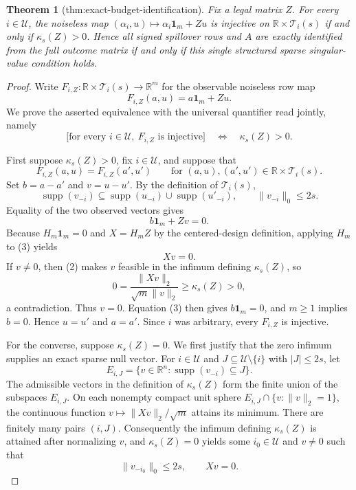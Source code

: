\documentclass{article}
\newtheorem{theorem}{Theorem}
\begin{document}
\begin{theorem}[thm:exact-budget-identification]\label{thm:exact-budget-identification}
Fix a legal matrix \(Z\). For every \(i\in\mathcal U\), the noiseless map \((\alpha_i,u)\mapsto\alpha_i\mathbf 1_m+Zu\) is injective on \(\mathbb R\times\mathcal T_i(s)\) if and only if \(\kappa_s(Z)>0\). Hence all signed spillover rows and \(A\) are exactly identified from the full outcome matrix if and only if this single structured sparse singular-value condition holds.
\end{theorem}
\begin{proof}
Write \(F_{i,Z}:\mathbb R\times\mathcal T_i(s)\to\mathbb R^m\) for the observable noiseless row map
\[
F_{i,Z}(a,u)=a\mathbf 1_m+Zu.
\]
We prove the asserted equivalence with the universal quantifier read jointly, namely
\[
\bigl[\text{for every }i\in\mathcal U,\ F_{i,Z}\text{ is injective}\bigr]
\quad\Longleftrightarrow\quad \kappa_s(Z)>0. \tag{1}
\]

First suppose \(\kappa_s(Z)>0\), fix \(i\in\mathcal U\), and suppose that
\[
F_{i,Z}(a,u)=F_{i,Z}(a',u')
\qquad
\text{for }(a,u),(a',u')\in\mathbb R\times\mathcal T_i(s).
\]
Set \(b=a-a'\) and \(v=u-u'\).  By the definition of \(\mathcal T_i(s)\),
\[
\operatorname{supp}(v_{-i})
 \subseteq \operatorname{supp}(u_{-i})\cup\operatorname{supp}(u'_{-i}),
\qquad
\lVert v_{-i}\rVert_0\le 2s. \tag{2}
\]
Equality of the two observed vectors gives
\[
b\mathbf 1_m+Zv=0. \tag{3}
\]
Because \(H_m\mathbf 1_m=0\) and \(X=H_mZ\) by the centered-design definition, applying \(H_m\) to (3) yields
\[
Xv=0. \tag{4}
\]
If \(v\ne0\), then (2) makes \(v\) feasible in the infimum defining \(\kappa_s(Z)\), so
\[
0=\frac{\lVert Xv\rVert_2}{\sqrt m\lVert v\rVert_2}
 \ge \kappa_s(Z)>0,
\]
a contradiction.  Thus \(v=0\).  Equation (3) then gives \(b\mathbf 1_m=0\), and \(m\ge1\) implies \(b=0\).  Hence \(u=u'\) and \(a=a'\).  Since \(i\) was arbitrary, every \(F_{i,Z}\) is injective.

For the converse, suppose \(\kappa_s(Z)=0\).  We first justify that the zero infimum supplies an exact sparse null vector.  For \(i\in\mathcal U\) and \(J\subseteq\mathcal U\setminus\{i\}\) with \(\lvert J\rvert\le2s\), let
\[
E_{i,J}=\{v\in\mathbb R^n:\operatorname{supp}(v_{-i})\subseteq J\}.
\]
The admissible vectors in the definition of \(\kappa_s(Z)\) form the finite union of the subspaces \(E_{i,J}\).  On each nonempty compact unit sphere
\(E_{i,J}\cap\{v:\lVert v\rVert_2=1\}\), the continuous function \(v\mapsto\lVert Xv\rVert_2/\sqrt m\) attains its minimum.  There are finitely many pairs \((i,J)\).  Consequently the infimum defining \(\kappa_s(Z)\) is attained after normalizing \(v\), and \(\kappa_s(Z)=0\) yields some \(i_0\in\mathcal U\) and \(v\ne0\) such that
\[
\lVert v_{-i_0}\rVert_0\le2s,
\qquad Xv=0. \tag{5}
\]


\end{proof}
\end{document}
